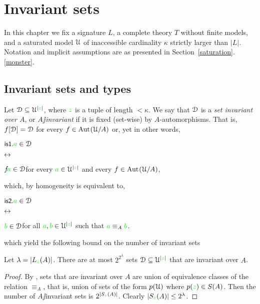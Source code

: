 \documentclass[creche.tex]{subfiles}
\begin{document}
\chapter{Invariant sets}
\label{invariant}


\def\medrel#1{\parbox[t]{6ex}{$\displaystyle\hfil #1$}}
\def\ceq#1#2#3{\parbox[t]{18ex}{$\displaystyle #1$}\medrel{#2}{$\displaystyle #3$}}

\def\mr{\color{brown}}
\def\gr{\color{green}}


In this chapter we fix a signature $L$, a complete theory $T$ without finite models, and a saturated model $\EuScript U$ of inaccessible cardinality $\kappa$ strictly larger than $|L|$. Notation and implicit assumptions are as presented in Section~\ref{saturation}.\ref{monster}.

\section{Invariant sets and types}\label{invariant_sets}

Let $\D\subseteq\U^{|{\gr z}|}$, where ${\gr z}$ is a tuple of length $<\kappa$. We say that $\EuScript D$ is a \emph{set invariant over $A$}, or \emph{$A\jj$invariant\/} if it is fixed (set-wise) by $A$-automorphisms. That is, $f[\EuScript D]=\EuScript D$ for every $f\in\textrm{Aut\kern.15ex}(\EuScript U/A)$ or, yet in other words,

\ceq{\ssf{is1.}\hfill {\gr a}\in\D}{\iff}{f\!{\gr a}\in\D}\hfill for every ${\gr a}\in\U^{|{\gr z}|}$ and every $f\in\textrm{Aut\kern.15ex}(\EuScript U/A)$,

which, by homogeneity is equivalent to,

\ceq{\ssf{is2.}\hfill {\gr a}\in\D}{\iff}{{\gr b}\in\D}\hfill for all ${\gr a},{\gr b}\in\U^{|{\gr z}|}$ such that ${\gr a}\equiv_A{\gr b}$.

which yield the following bound on the number of invariant sets

\begin{proposition}\label{prop_numberIS}
  Let $\lambda=|L_{\gr z}(A)|$. There are at most $2^{2^{\lambda}}$ sets $\D\subseteq\U^{|{\gr z}|}$ that are invariant over $A$.
\end{proposition}
\begin{proof}
By , sets that are invariant over $A$ are union of equivalence classes of the relation $\equiv_A$, that is, union of sets of the form $p(\EuScript U)$ where $p({\gr z})\in S(A)$. Then the number of $A\jj$invariant sets is $2^{|S_{\gr z}(A)|}$. Clearly $|S_{\gr z}(A)|\le 2^\lambda$.
\end{proof} 
\end{document}
